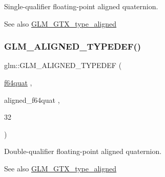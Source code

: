 Single-\/qualifier floating-\/point aligned quaternion. \begin{DoxySeeAlso}{See also}
\mbox{\hyperlink{group__gtx__type__aligned}{G\+L\+M\+\_\+\+G\+T\+X\+\_\+type\+\_\+aligned}} 
\end{DoxySeeAlso}
\mbox{\label{group__gtx__type__aligned_ga95cc03b8b475993fa50e05e38e203303}} 
\subsubsection{\texorpdfstring{G\+L\+M\+\_\+\+A\+L\+I\+G\+N\+E\+D\+\_\+\+T\+Y\+P\+E\+D\+E\+F()}{GLM\_ALIGNED\_TYPEDEF()}\hspace{0.1cm}{\footnotesize\ttfamily [209/209]}}
{\footnotesize\ttfamily glm\+::\+G\+L\+M\+\_\+\+A\+L\+I\+G\+N\+E\+D\+\_\+\+T\+Y\+P\+E\+D\+EF (\begin{DoxyParamCaption}\item[{\mbox{\hyperlink{group__gtc__type__precision_ga5b54d7b36fbee5e271f73e6ed74e7172}{f64quat}}}]{,  }\item[{aligned\+\_\+f64quat}]{,  }\item[{32}]{ }\end{DoxyParamCaption})}

Double-\/qualifier floating-\/point aligned quaternion. \begin{DoxySeeAlso}{See also}
\mbox{\hyperlink{group__gtx__type__aligned}{G\+L\+M\+\_\+\+G\+T\+X\+\_\+type\+\_\+aligned}} 
\end{DoxySeeAlso}

